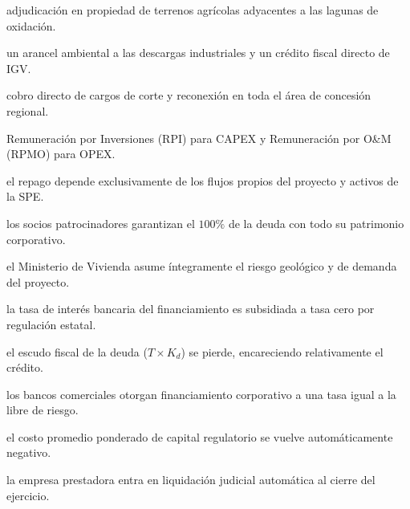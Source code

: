 \begin{opts}
    \item adjudicación en propiedad de terrenos agrícolas adyacentes a las lagunas de oxidación.
    \item un arancel ambiental a las descargas industriales y un crédito fiscal directo de IGV.
    \item cobro directo de cargos de corte y reconexión en toda el área de concesión regional.
    \item Remuneración por Inversiones (RPI) para CAPEX y Remuneración por O\&M (RPMO) para OPEX.
\end{opts}

\begin{opts}
    \item el repago depende exclusivamente de los flujos propios del proyecto y activos de la SPE.
    \item los socios patrocinadores garantizan el $100\%$ de la deuda con todo su patrimonio corporativo.
    \item el Ministerio de Vivienda asume íntegramente el riesgo geológico y de demanda del proyecto.
    \item la tasa de interés bancaria del financiamiento es subsidiada a tasa cero por regulación estatal.
\end{opts}

\begin{opts}
    \item el escudo fiscal de la deuda ($T \times K_d$) se pierde, encareciendo relativamente el crédito.
    \item los bancos comerciales otorgan financiamiento corporativo a una tasa igual a la libre de riesgo.
    \item el costo promedio ponderado de capital regulatorio se vuelve automáticamente negativo.
    \item la empresa prestadora entra en liquidación judicial automática al cierre del ejercicio.
\end{opts}

